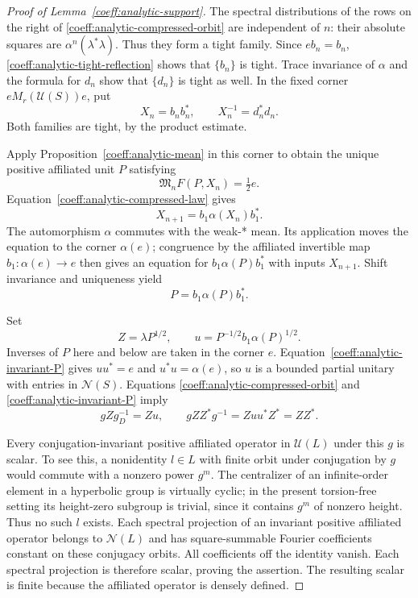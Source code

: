 \begin{proof}[Proof of Lemma~\ref{coeff:analytic-support}]
The spectral distributions of the rows on the right of
\eqref{coeff:analytic-compressed-orbit} are independent of \(n\):
their absolute squares are \(\alpha^n(\lambda^*\lambda)\).
Thus they form a tight family.  Since \(eb_n=b_n\),
\eqref{coeff:analytic-tight-reflection} shows that \(\{b_n\}\)
is tight.  Trace invariance of \(\alpha\) and the formula for \(d_n\)
show that \(\{d_n\}\) is tight as well.  In the fixed corner
\(eM_r(\mathcal U(S))e\), put
\[
 X_n=b_nb_n^*,\qquad X_n^{-1}=d_n^*d_n.
\]
Both families are tight, by the product estimate.

Apply Proposition~\ref{coeff:analytic-mean} in this corner to obtain
the unique positive affiliated unit \(P\) satisfying
\[
 \mathfrak M_nF(P,X_n)=\tfrac12 e.
\]
Equation~\eqref{coeff:analytic-compressed-law} gives
\[
 X_{n+1}=b_1\alpha(X_n)b_1^*.
\]
The automorphism \(\alpha\) commutes with the weak-* mean.
Its application moves the equation to the corner \(\alpha(e)\);
congruence by the affiliated invertible map
\(b_1:\alpha(e)\to e\) then gives an equation for
\(b_1\alpha(P)b_1^*\) with inputs \(X_{n+1}\).
Shift invariance and uniqueness yield
\begin{equation}\label{coeff:analytic-invariant-P}
 P=b_1\alpha(P)b_1^*.
\end{equation}

Set
\[
 Z=\lambda P^{1/2},\qquad
 u=P^{-1/2}b_1\alpha(P)^{1/2}.
\]
Inverses of \(P\) here and below are taken in the corner \(e\).
Equation~\eqref{coeff:analytic-invariant-P} gives
\(uu^*=e\) and \(u^*u=\alpha(e)\), so \(u\) is a bounded partial
unitary with entries in \(\mathcal N(S)\).  Equations
\eqref{coeff:analytic-compressed-orbit} and
\eqref{coeff:analytic-invariant-P} imply
\[
 gZg_D^{-1}=Zu,\qquad
 gZZ^*g^{-1}=Zuu^*Z^*=ZZ^*.
\]

Every conjugation-invariant positive affiliated operator in
\(\mathcal U(L)\) under this \(g\) is scalar.  To see this, a
nonidentity \(l\in L\) with finite orbit under conjugation by \(g\)
would commute with a nonzero power \(g^m\).
The centralizer of an infinite-order element in a hyperbolic group is
virtually cyclic; in the present torsion-free setting its
height-zero subgroup is trivial, since it contains \(g^m\) of nonzero
height.  Thus no such \(l\) exists.  Each spectral projection of an
invariant positive affiliated operator belongs to \(\mathcal N(L)\)
and has square-summable Fourier coefficients constant on these
conjugacy orbits.  All coefficients off the identity vanish.
Each spectral projection is therefore scalar, proving the assertion.
The resulting scalar is finite because the affiliated operator is
densely defined.


\end{proof}
